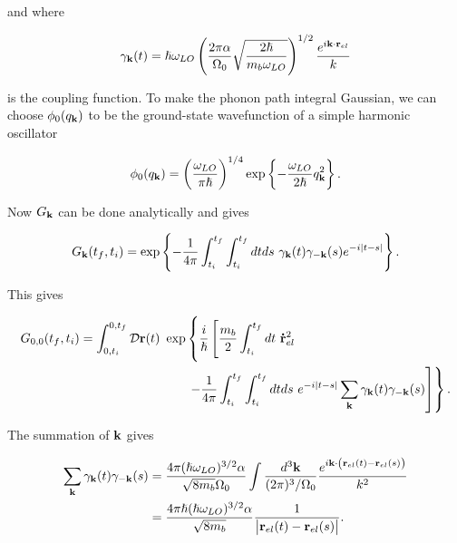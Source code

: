 and where

\begin{equation}
    \gamma_{\vb{k}}(t) = \hslash \omega_{LO} \left(\frac{2 \pi \alpha}{\Omega_0} \sqrt{\frac{2 \hslash}{m_b \omega_{LO}}}\right)^{1/2} \frac{e^{i \vb{k} \cdot \vb{r}_{el}}}{k}
\end{equation}

is the coupling function. To make the phonon path integral Gaussian, we can choose $\phi_0(q_{\vb{k}})$ to be the ground-state wavefunction of a simple harmonic oscillator

\begin{equation}
    \phi_0(q_{\vb{k}}) = \left(\frac{\omega_{LO}}{\pi\hslash}\right)^{1/4} \exp \left\{-\frac{\omega_{LO}}{2\hslash} q_{\vb{k}}^2\right\}.
\end{equation}

Now $G_{\vb{k}}$ can be done analytically and gives

\begin{equation}
    G_{\vb{k}}(t_f, t_i) = \exp \left\{ -\frac{1}{4\pi} \int_{t_i}^{t_f} \int_{t_i}^{t_f} dt ds\ \gamma_{\vb{k}}(t) \gamma_{\vb{-k}}(s) e^{-i\abs{t-s}} \right\}.
\end{equation}

This gives

\begin{equation}
\begin{aligned}
    G_{0,0}(t_f, t_i) = \int^{0, t_f}_{0, t_i} \mathcal{D}\vb{r}(t)\ \exp&\left\{ \frac{i}{\hslash} \left[  \frac{m_b}{2} \int^{t_f}_{t_i} dt\ \vb{\dot{r}}_{el}^2 \right.\right. \\
    &\left.\left.-\frac{1}{4\pi} \int_{t_i}^{t_f} \int_{t_i}^{t_f} dt ds\ e^{-i\abs{t-s}} \sum_{\vb{k}} \gamma_{\vb{k}}(t) \gamma_{\vb{-k}}(s) \right] \right\}.
\end{aligned}
\end{equation}

The summation of $\vb{k}$ gives

\begin{equation}
\begin{aligned}
    \sum_{\vb{k}} \gamma_{\vb{k}}(t) \gamma_{\vb{-k}}(s) &= \frac{4\pi(\hslash \omega_{LO})^{3/2} \alpha}{\sqrt{8 m_b} \Omega_0} \int \frac{d^3\vb{k}}{(2\pi)^3/\Omega_0} \frac{e^{i\vb{k}\cdot \left(\vb{r}_{el}(t) - \vb{r}_{el}(s) \right)}}{k^2} \\
    &= \frac{4\pi\hslash(\hslash \omega_{LO})^{3/2} \alpha}{\sqrt{8 m_b}} \frac{1}{\abs{\vb{r}_{el}(t) - \vb{r}_{el}(s)}}.
\end{aligned}
\end{equation}

